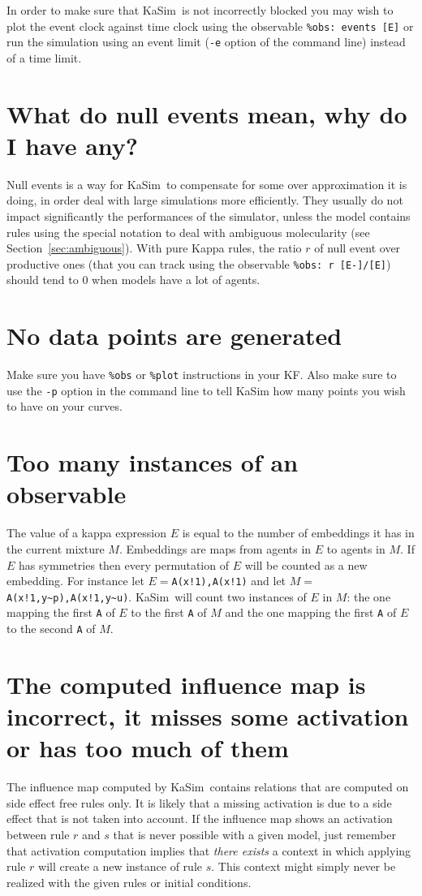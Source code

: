 \documentclass[11pt]{book}
\def\KaSim{\textsf{KaSim}}
\def\intstate{\textasciitilde}
\def\ttt#1{\texttt{#1}}
\begin{document}
In order to make sure that \KaSim~is not incorrectly blocked you may wish to plot the event clock against time clock using the observable \ttt{\%obs: {\textquotesingle}events{\textquotesingle} [E]} or run the simulation using an event limit (\ttt{-e} option of the command line) instead of a time limit.

\section*{What do null events mean, why do I have any?}

Null events is a way for \KaSim~to compensate for some over approximation it is doing, in order deal with large simulations more efficiently. They usually do not impact significantly the performances of the simulator, unless the model contains rules using the special notation to deal with ambiguous molecularity (see Section~\ref{sec:ambiguous}). With pure Kappa rules, the ratio $r$ of null event over productive ones (that you can track using the observable \ttt{\%obs: {\textquotesingle}r{\textquotesingle}  [E-]/[E]}) should tend to 0 when models have a lot of agents.

\section*{No data points are generated}
Make sure you have \ttt{\%obs} or \ttt{\%plot} instructions in your KF. Also make sure to use the \ttt{-p} option in the command line to tell KaSim how many points you wish to have on your curves. 

\section*{Too many instances of an observable}
The value of a kappa expression $E$  is equal to the number of embeddings it has in the current mixture $M$. Embeddings are maps from agents in $E$  to agents in $M$. If $E$ has symmetries then every permutation of $E$ will be counted as a new embedding. For instance let $E=$\ttt{A(x!1),A(x!1)}  and let $M=$\ttt{A(x!1,y\intstate p),A(x!1,y\intstate u)}. 
\KaSim~will count two instances of $E$ in $M$: the one mapping the first \ttt{A} of $E$ to the first \ttt{A} of $M$ and the one mapping the first \ttt{A} of $E$ to the second \ttt{A} of $M$.
 
\section*{The computed influence map is incorrect, it misses some activation or has too much of them}
The influence map computed by \KaSim~contains relations that are computed on side effect free rules only. It is likely that a missing activation is due to a side effect that is not taken into account. If the influence map shows an activation between rule $r$ and $s$ that is never possible with a given model, just remember that activation computation implies that \emph{there exists} a context in which applying rule $r$ will create a new instance of rule $s$. This context might simply never be realized with the given rules or initial conditions.
\end{document}
